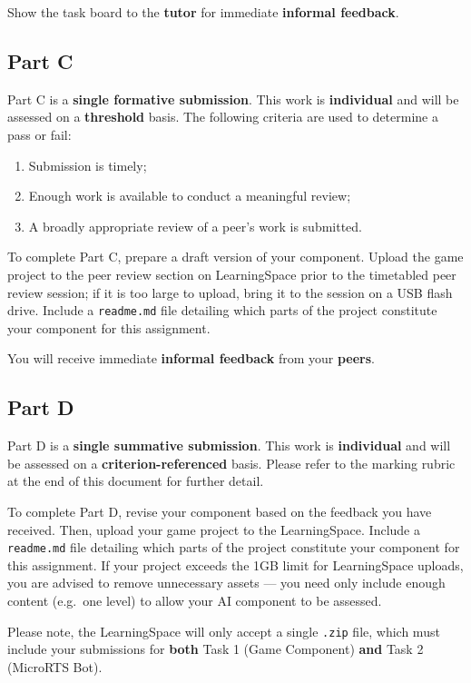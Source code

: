 \documentclass{../../fal_assignment}
\begin{document}
Show the task board to the \textbf{tutor} for immediate \textbf{informal feedback}.

\subsection*{Part C}

Part C is a \textbf{single formative submission}. This work is \textbf{individual} and will be assessed on a \textbf{threshold} basis. The following criteria are used to determine a pass or fail:

\begin{enumerate}[label=(\alph*)]
	\item Submission is timely;
	\item Enough work is available to conduct a meaningful review;
	\item A broadly appropriate review of a peer's work is submitted.
\end{enumerate}

To complete Part C, prepare a draft version of your component.
Upload the game project to the peer review section on LearningSpace prior to the timetabled peer review session;
if it is too large to upload, bring it to the session on a USB flash drive.
Include a \texttt{readme.md} file detailing which parts of the project constitute your component for this assignment.

You will receive immediate \textbf{informal feedback} from your \textbf{peers}.

\subsection*{Part D}

Part D is a \textbf{single summative submission}. This work is \textbf{individual} and will be assessed on a \textbf{criterion-referenced} basis. Please refer to the marking rubric at the end of this document for further detail.

To complete Part D, revise your component based on the feedback you have received. Then, upload your game project to the LearningSpace.
Include a \texttt{readme.md} file detailing which parts of the project constitute your component for this assignment.
If your project exceeds the 1GB limit for LearningSpace uploads, you are advised to remove unnecessary assets ---
you need only include enough content (e.g.\ one level) to allow your AI component to be assessed.

Please note, the LearningSpace will only accept a single \texttt{.zip} file, which must include your submissions for
\textbf{both} Task 1 (Game Component) \textbf{and} Task 2 (MicroRTS Bot).
\end{document}
